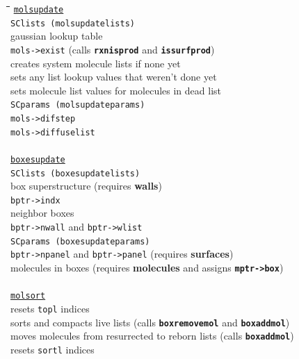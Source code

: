 \documentclass {scrbook}
\newcommand {\ttt} {\texttt}
\begin{document}
\begin{tabbing}
\hspace{0.25in}\=\hspace{0.25in}\=\hspace{0.25in}\=\hspace{0.25in}\=\hspace{0.25in}\=\kill
\>\ttt{\underline{molsupdate}}\\
\>\>\ttt{SClists (molsupdatelists)}\\
\>\>\>gaussian lookup table\\
\>\>\>\ttt{mols->exist} (calls \ttt{\textbf{rxnisprod}} and \ttt{\textbf{issurfprod}})\\
\>\>\>creates system molecule lists if none yet\\
\>\>\>sets any list lookup values that weren't done yet\\
\>\>\>sets molecule list values for molecules in dead list\\
\>\>\ttt{SCparams (molsupdateparams)}\\
\>\>\>\ttt{mols->difstep}\\
\>\>\>\ttt{mols->diffuselist}\\
\>\\
\>\ttt{\underline{boxesupdate}}\\
\>\>\ttt{SClists (boxesupdatelists)}\\
\>\>\>box superstructure (requires \textbf{walls})\\
\>\>\>\ttt{bptr->indx}\\
\>\>\>neighbor boxes\\
\>\>\>\ttt{bptr->nwall} and \ttt{bptr->wlist}\\
\>\>\ttt{SCparams (boxesupdateparams)}\\
\>\>\>\ttt{bptr->npanel} and \ttt{bptr->panel} (requires \textbf{surfaces})\\
\>\>\>molecules in boxes (requires \textbf{molecules} and assigns \ttt{\textbf{mptr->box}})\\
\>\\
\>\ttt{\underline{molsort}}\\
\>\>\>resets \ttt{topl} indices\\
\>\>\>sorts and compacts live lists (calls \ttt{\textbf{boxremovemol}} and \ttt{\textbf{boxaddmol}})\\
\>\>\>moves molecules from resurrected to reborn lists (calls \ttt{\textbf{boxaddmol}})\\
\>\>\>resets \ttt{sortl} indices\\
\>\\

\end{tabbing}
\end{document}
